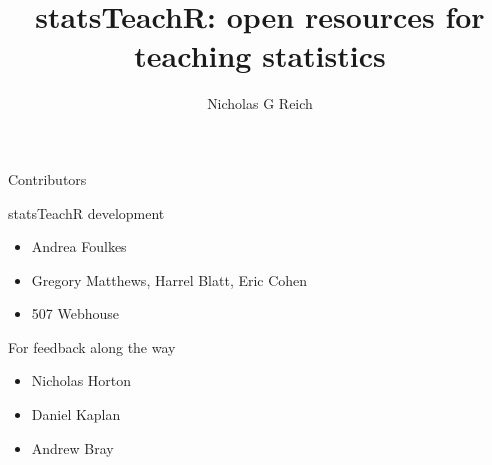 
\usepackage{multicol}

\title{statsTeachR: open resources for teaching statistics}
\newcommand{\ModuleShortname}{}
\author{Nicholas G Reich}
\newcommand{\LicenseText}{Made available under the Creative Commons Attribution-ShareAlike 3.0 Unported License: http://creativecommons.org/licenses/by-sa/3.0/deed.en\textunderscore US }
\newcommand{\Instructor}{New England Statistics Symposium}
\newcommand{\Course}{26 April 2014}

\hypersetup{colorlinks=true, urlcolor=blue, linkcolor=black}






\begin{frame}[plain]
	\titlepage
\end{frame}




\begin{frame}{Contributors}

\begin{block}{statsTeachR development}
\begin{itemize}
        \item Andrea Foulkes
        \item Gregory Matthews, Harrel Blatt, Eric Cohen
        \item 507 Webhouse 
\end{itemize}
\end{block}

\begin{block}{For feedback along the way}
\begin{itemize}
        \item Nicholas Horton
        \item Daniel Kaplan
        \item Andrew Bray
\end{itemize}
\end{block}

\end{frame}



